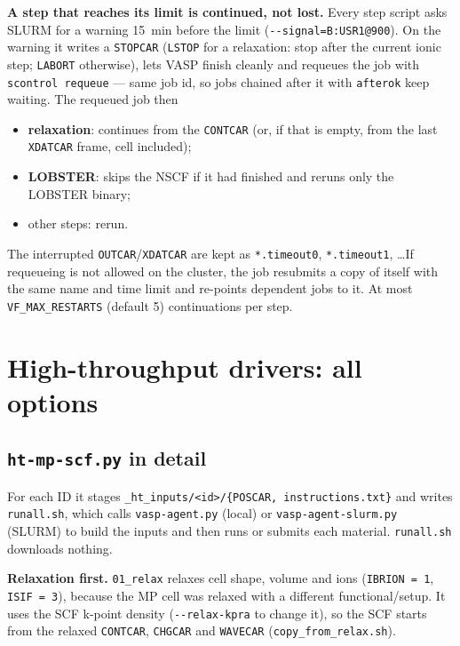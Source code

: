 \documentclass[11pt,a4paper]{scrartcl}
\begin{document}
\textbf{A step that reaches its limit is continued, not lost.}  Every step
script asks SLURM for a warning 15~min before the limit
(\texttt{-{}-signal=B:USR1@900}).  On the warning it writes a
\texttt{STOPCAR} (\texttt{LSTOP} for a relaxation: stop after the current
ionic step; \texttt{LABORT} otherwise), lets VASP finish cleanly and requeues
the job with \texttt{scontrol requeue} --- same job id, so jobs chained after
it with \texttt{afterok} keep waiting.  The requeued job then
\begin{itemize}
  \item \textbf{relaxation}: continues from the \texttt{CONTCAR} (or, if that
    is empty, from the last \texttt{XDATCAR} frame, cell included);
  \item \textbf{LOBSTER}: skips the NSCF if it had finished and reruns only
    the LOBSTER binary;
  \item other steps: rerun.
\end{itemize}
The interrupted \texttt{OUTCAR}/\texttt{XDATCAR} are kept as
\texttt{*.timeout0}, \texttt{*.timeout1}, \ldots  If requeueing is not
allowed on the cluster, the job resubmits a copy of itself with the same
name and time limit and re-points dependent jobs to it.  At most
\texttt{VF\_MAX\_RESTARTS} (default 5) continuations per step.

\section{High-throughput drivers: all options}
\label{app:ht}

\subsection{\texttt{ht-mp-scf.py} in detail}
\label{sec:ht-mp-scf}

For each ID it stages \texttt{\_ht\_inputs/<id>/\{POSCAR, instructions.txt\}}
and writes \texttt{runall.sh}, which calls \texttt{vasp-agent.py} (local) or
\texttt{vasp-agent-slurm.py} (SLURM) to build the inputs and then runs or
submits each material.  \texttt{runall.sh} downloads nothing.

\textbf{Relaxation first.}  \texttt{01\_relax} relaxes cell shape, volume and
ions (\texttt{IBRION = 1}, \texttt{ISIF = 3}), because the MP cell was relaxed
with a different functional/setup.  It uses the SCF k-point density
(\texttt{-{}-relax-kpra} to change it), so the SCF starts from the relaxed
\texttt{CONTCAR}, \texttt{CHGCAR} and \texttt{WAVECAR}
(\texttt{copy\_from\_relax.sh}).
\end{document}
